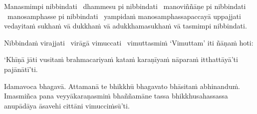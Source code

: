 Manasmimpi nibbindati \breathmark\ dhammesu pi nibbindati \breathmark\ manoviññāṇe pi nibbindati \breathmark\ manosamphasse pi nibbindati \breathmark\ yampidaṁ manosamphassapaccayā uppajjati vedayitaṁ sukhaṁ vā dukkhaṁ vā adukkhamasukhaṁ vā tasmimpi nibbindati.

Nibbindaṁ virajjati \breathmark\ virāgā vimuccati \breathmark\ vimuttasmiṁ ‘Vimuttam’ iti ñāṇaṁ hoti:

‘Khīṇā jāti vusitaṁ brahmacariyaṁ kataṁ karaṇīyaṁ nāparaṁ itthattāyā’ti pajānātī’ti.

Idamavoca bhagavā. Attamanā te bhikkhū bhagavato bhāsitaṁ abhinanduṁ. Imasmiñca pana veyyākaraṇasmiṁ bhaññamāne tassa bhikkhusahassassa anupādāya āsavehi cittāni vimucciṁsū’ti.

\suttaRef{[SN 35.28]}

